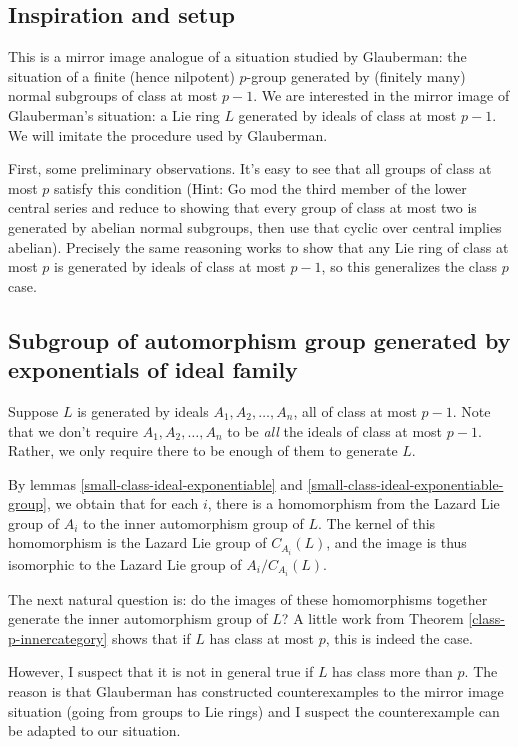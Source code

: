 \documentclass[10pt]{amsart}
\begin{document}
\subsection{Inspiration and setup}

This is a mirror image analogue of a situation studied by Glauberman:
the situation of a finite (hence nilpotent) $p$-group generated by
(finitely many) normal subgroups of class at most $p - 1$. We are
interested in the mirror image of Glauberman's situation: a Lie ring
$L$ generated by ideals of class at most $p - 1$. We will imitate the
procedure used by Glauberman.

First, some preliminary observations. It's easy to see that all groups
of class at most $p$ satisfy this condition (Hint: Go mod the third
member of the lower central series and reduce to showing that every
group of class at most two is generated by abelian normal subgroups,
then use that cyclic over central implies abelian). Precisely the same
reasoning works to show that any Lie ring of class at most $p$ is
generated by ideals of class at most $p - 1$, so this generalizes the
class $p$ case.

\subsection{Subgroup of automorphism group generated by exponentials of ideal family}

Suppose $L$ is generated by ideals $A_1, A_2, \dots, A_n$, all of
class at most $p - 1$. Note that we don't require $A_1, A_2, \dots, A_n$ to be {\em all} the ideals of class at most $p - 1$. Rather, we only require there to be enough of them to generate $L$. 

By lemmas \ref{small-class-ideal-exponentiable} and
\ref{small-class-ideal-exponentiable-group}, we obtain that for each
$i$, there is a homomorphism from the Lazard Lie group of $A_i$ to the
inner automorphism group of $L$. The kernel of this homomorphism is
the Lazard Lie group of $C_{A_i}(L)$, and the image is thus isomorphic
to the Lazard Lie group of $A_i/C_{A_i}(L)$.

The next natural question is: do the images of these homomorphisms
together generate the inner automorphism group of $L$? A little work
from Theorem \ref{class-p-innercategory} shows that if $L$ has class
at most $p$, this is indeed the case.

However, I suspect that it is not in general true if $L$ has class more than
$p$. The reason is that Glauberman has constructed counterexamples to
the mirror image situation (going from groups to Lie rings) and I
suspect the counterexample can be adapted to our situation.
\end{document}
